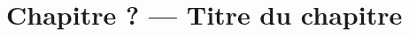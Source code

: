 \documentclass[a4paper,12pt]{article}
\begin{document}

\section*{Chapitre ? — Titre du chapitre}




\propriete{

}


%


\methode{

}


\exemple{

}


%


\aretenir{

}


\correction{

\enonce



\redaction



\solution



}


%
\end{document}
